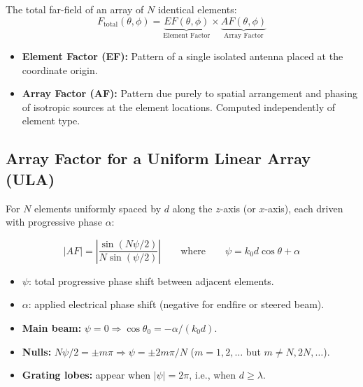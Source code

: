 \documentclass[10pt,letterpaper]{article}
\begin{document}
\begin{tcolorbox}[formulabox, title={Pattern Multiplication}]
The total far-field of an array of $N$ identical elements:
\begin{equation}
  \boxed{F_\mathrm{total}(\theta,\phi) = \underbrace{EF(\theta,\phi)}_{\text{Element Factor}} \times \underbrace{AF(\theta,\phi)}_{\text{Array Factor}}}
\end{equation}
\begin{itemize}[noitemsep]
  \item \textbf{Element Factor (EF):} Pattern of a single isolated antenna placed at the coordinate origin.
  \item \textbf{Array Factor (AF):} Pattern due purely to spatial arrangement and phasing of isotropic sources at the element locations. Computed independently of element type.
\end{itemize}
\end{tcolorbox}

\subsection{Array Factor for a Uniform Linear Array (ULA)}

For $N$ elements uniformly spaced by $d$ along the $z$-axis (or $x$-axis), each driven with progressive phase $\alpha$:

\begin{tcolorbox}[formulabox, title={ULA Array Factor}]
\begin{equation}
  |AF| = \left|\frac{\sin(N\psi/2)}{N\sin(\psi/2)}\right| \qquad \text{where} \qquad \psi = k_0 d\cos\theta + \alpha
\end{equation}
\begin{itemize}[noitemsep]
  \item $\psi$: total progressive phase shift between adjacent elements.
  \item $\alpha$: applied electrical phase shift (negative for endfire or steered beam).
  \item \textbf{Main beam:} $\psi = 0 \Rightarrow \cos\theta_0 = -\alpha/(k_0 d)$.
  \item \textbf{Nulls:} $N\psi/2 = \pm m\pi \Rightarrow \psi = \pm 2m\pi/N$ ($m = 1, 2, \ldots$ but $m\neq N, 2N, \ldots$).
  \item \textbf{Grating lobes:} appear when $|\psi| = 2\pi$, i.e., when $d \geq \lambda$.
\end{itemize}
\end{tcolorbox}
\end{document}
